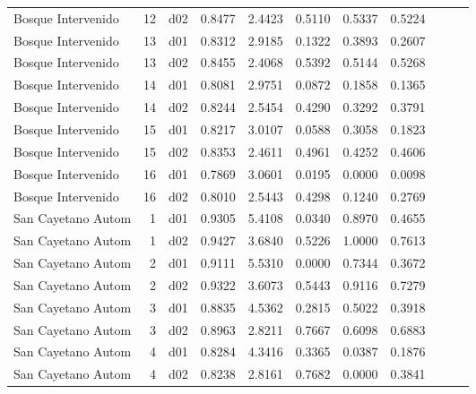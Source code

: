 \begin{landscape}
\begin{longtable}{p{2cm}rrrrrrrrrr}
    Bosque Intervenido    &         12 &     d02 &   0.8477 &  2.4423 &        0.5110 &           0.5337 &  0.5224 \\
    Bosque Intervenido    &         13 &     d01 &   0.8312 &  2.9185 &        0.1322 &           0.3893 &  0.2607 \\
    Bosque Intervenido    &         13 &     d02 &   0.8455 &  2.4068 &        0.5392 &           0.5144 &  0.5268 \\
    Bosque Intervenido    &         14 &     d01 &   0.8081 &  2.9751 &        0.0872 &           0.1858 &  0.1365 \\
    Bosque Intervenido    &         14 &     d02 &   0.8244 &  2.5454 &        0.4290 &           0.3292 &  0.3791 \\
    Bosque Intervenido    &         15 &     d01 &   0.8217 &  3.0107 &        0.0588 &           0.3058 &  0.1823 \\
    Bosque Intervenido    &         15 &     d02 &   0.8353 &  2.4611 &        0.4961 &           0.4252 &  0.4606 \\
    Bosque Intervenido    &         16 &     d01 &   0.7869 &  3.0601 &        0.0195 &           0.0000 &  0.0098 \\
    Bosque Intervenido    &         16 &     d02 &   0.8010 &  2.5443 &        0.4298 &           0.1240 &  0.2769 \\
     San Cayetano Autom   &          1 &     d01 &   0.9305 &  5.4108 &        0.0340 &           0.8970 &  0.4655 \\
     San Cayetano Autom   &          1 &     d02 &   0.9427 &  3.6840 &        0.5226 &           1.0000 &  0.7613 \\
     San Cayetano Autom   &          2 &     d01 &   0.9111 &  5.5310 &        0.0000 &           0.7344 &  0.3672 \\
     San Cayetano Autom   &          2 &     d02 &   0.9322 &  3.6073 &        0.5443 &           0.9116 &  0.7279 \\
     San Cayetano Autom   &          3 &     d01 &   0.8835 &  4.5362 &        0.2815 &           0.5022 &  0.3918 \\
     San Cayetano Autom   &          3 &     d02 &   0.8963 &  2.8211 &        0.7667 &           0.6098 &  0.6883 \\
     San Cayetano Autom   &          4 &     d01 &   0.8284 &  4.3416 &        0.3365 &           0.0387 &  0.1876 \\
     San Cayetano Autom   &          4 &     d02 &   0.8238 &  2.8161 &        0.7682 &           0.0000 &  0.3841 \\

\end{longtable}
\end{landscape}
